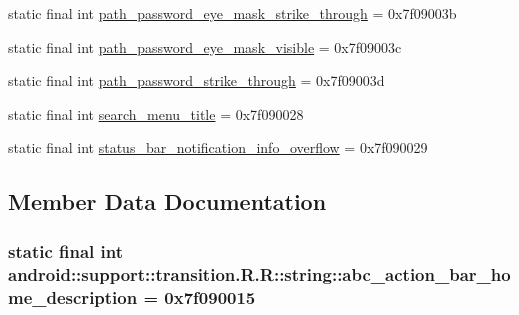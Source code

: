 \begin{CompactItemize}
\item 
static final int \hyperlink{classandroid_1_1support_1_1transition_1_1_r_1_1string_2f9e5ead2fcd72d44248c5e48c0c0638}{path\_\-password\_\-eye\_\-mask\_\-strike\_\-through} = 0x7f09003b
\item 
static final int \hyperlink{classandroid_1_1support_1_1transition_1_1_r_1_1string_46a670e2b1f71c84f22e3fd38591aabd}{path\_\-password\_\-eye\_\-mask\_\-visible} = 0x7f09003c
\item 
static final int \hyperlink{classandroid_1_1support_1_1transition_1_1_r_1_1string_1d2d01c4abbb0e02e7ba1f8b22eaffd0}{path\_\-password\_\-strike\_\-through} = 0x7f09003d
\item 
static final int \hyperlink{classandroid_1_1support_1_1transition_1_1_r_1_1string_7176be961da4702856ab2a5d12742a6c}{search\_\-menu\_\-title} = 0x7f090028
\item 
static final int \hyperlink{classandroid_1_1support_1_1transition_1_1_r_1_1string_22208edacd130e5ea6030c9865a8dbf8}{status\_\-bar\_\-notification\_\-info\_\-overflow} = 0x7f090029
\end{CompactItemize}


\subsection{Member Data Documentation}
\hypertarget{classandroid_1_1support_1_1transition_1_1_r_1_1string_c8f8c7d5483fb8949515edafb7f744b5}{
\subsubsection[{abc\_\-action\_\-bar\_\-home\_\-description}]{\setlength{\rightskip}{0pt plus 5cm}static final int android::support::transition.R.R::string::abc\_\-action\_\-bar\_\-home\_\-description = 0x7f090015}}
\label{classandroid_1_1support_1_1transition_1_1_r_1_1string_c8f8c7d5483fb8949515edafb7f744b5}


